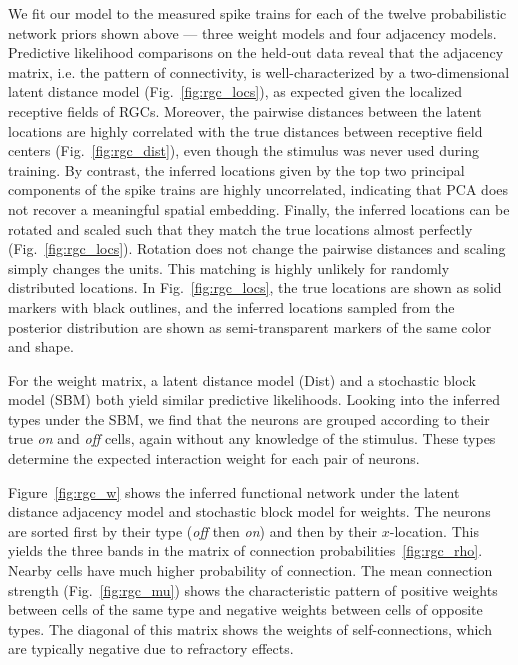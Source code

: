 \sloppy
We fit our model to the measured spike trains for each of the twelve
probabilistic network priors shown above --- three weight models and
four adjacency models. Predictive likelihood comparisons on the
held-out data reveal that the adjacency matrix, i.e. the pattern of
connectivity, is well-characterized by a two-dimensional latent
distance model (Fig.~\ref{fig:rgc_locs}), as expected given the
localized receptive fields of RGCs. Moreover, the pairwise distances
between the latent locations are highly correlated with the true
distances between receptive field centers (Fig.~\ref{fig:rgc_dist}),
even though the stimulus was never used during training. By contrast,
the inferred locations given by the top two principal components of
the spike trains are highly uncorrelated, indicating that PCA does not
recover a meaningful spatial embedding.  Finally, the inferred
locations can be rotated and scaled such that they match the true
locations almost perfectly (Fig.~\ref{fig:rgc_locs}). Rotation does
not change the pairwise distances and scaling simply changes the
units. This matching is highly unlikely for randomly distributed
locations.  In Fig.~\ref{fig:rgc_locs}, the true locations are shown
as solid markers with black outlines, and the inferred locations
sampled from the posterior distribution are shown as semi-transparent
markers of the same color and shape.

For the weight matrix, a latent distance model (Dist) and a stochastic
block model (SBM) both yield similar predictive likelihoods. Looking
into the inferred types under the SBM, we find that the neurons are
grouped according to their true \textit{on} and \textit{off} cells,
again without any knowledge of the stimulus. These types determine 
the expected interaction weight for each pair of neurons. 

Figure~\ref{fig:rgc_w} shows the inferred functional network under the
latent distance adjacency model and stochastic block model for
weights.  The neurons are sorted first by their type (\textit{off}
then \textit{on}) and then by their $x$-location. This yields the
three bands in the matrix of connection
probabilities~\ref{fig:rgc_rho}. Nearby cells have much higher
probability of connection. The mean connection strength
(Fig.~\ref{fig:rgc_mu}) shows the characteristic pattern of positive
weights between cells of the same type and negative weights between
cells of opposite types. The diagonal of this matrix shows the weights
of self-connections, which are typically negative due to refractory
effects. 

